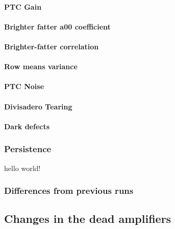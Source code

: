\paragraph{PTC Gain}\label{ptc-gain-2}

\paragraph{\texorpdfstring{Brighter fatter a{00}
coefficient}{Brighter fatter a00 coefficient}}\label{brighter-fatter-a00-coefficient-2}

\paragraph{Brighter-fatter
correlation}\label{brighter-fatter-correlation-1}

\paragraph{Row means variance}\label{row-means-variance-1}

\paragraph{PTC Noise}\label{ptc-noise-1}

\paragraph{Divisadero Tearing}\label{divisadero-tearing-2}

\paragraph{Dark defects}\label{dark-defects-2}

\subsubsection{Persistence}\label{persistence-2}
hello world!
\subsubsection{Differences from previous
runs}\label{differences-from-previous-runs-2}

\subsection{Changes in the dead amplifiers}\label{deadamplifiers}


